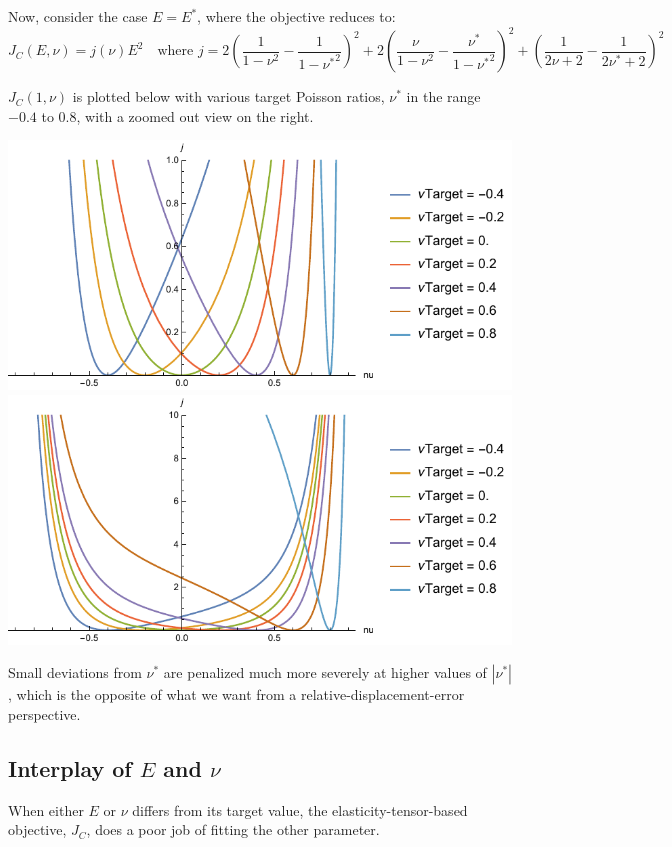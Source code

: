 \documentclass[10pt]{article}
\begin{document}
Now, consider the case $E = E^*$, where the objective reduces to:
$$
J_C(E, \nu) = j(\nu) E^2 \quad \text{where }
j = 
    2 \left(\frac{1}{1-\nu ^2}-\frac{1}{1-{\nu^*}^2}\right)^2+2
    \left(\frac{\nu }{1-\nu ^2}-\frac{{\nu^*}}{1-{\nu^*}^2}\right)^2+\left(\frac{1}{2 \nu +2}-\frac{1}{2 {\nu^*}+2}\right)^2
$$

$J_C(1, \nu)$ is plotted below with various target Poisson ratios, $\nu^*$ in
the range $-0.4$ to $0.8$, with a zoomed out view on the right.
\\
\begin{minipage}{\linewidth}
    \centering
    \includegraphics[width=.45\textwidth]{vPlot.pdf}
    \includegraphics[width=.45\textwidth]{vPlotZoomOut.pdf}
\end{minipage}
Small deviations from $\nu^*$ are penalized much more severely at higher values
of $\left|\nu^*\right|$, which is the opposite of what we want from a
relative-displacement-error perspective.

\subsection{Interplay of $E$ and $\nu$}
When either $E$ or $\nu$ differs from its target value, the
elasticity-tensor-based objective, $J_C$, does a poor job of fitting the other
parameter.
\end{document}
